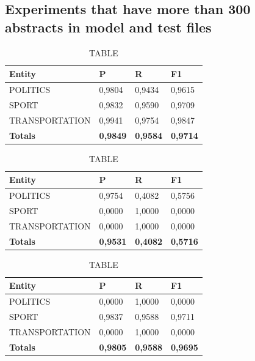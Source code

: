 \documentclass[thesis=M,english]{FITthesis}[2018/05/30]
\begin{document}

\subsection{Experiments that have more than 300 abstracts in model and test files}
	\begin{table}[H]\centering
		\caption{TABLE}
		\label{}
		\begin{tabular}{|l|l|l|l|}
			\hline {\textbf{Entity}} & {\textbf{P}} & {\textbf{R}} & {\textbf{F1}}\\\hline
				POLITICS & 0,9804 & 0,9434 & 0,9615\\
				SPORT & 0,9832 & 0,9590 & 0,9709\\
				TRANSPORTATION & 0,9941 & 0,9754 & 0,9847\\\hline
				\textbf{Totals} & \textbf{0,9849} & \textbf{0,9584} & \textbf{0,9714}\\\hline
		\end{tabular}
	\end{table}

	\begin{table}[H]\centering
		\caption{TABLE}
		\label{}
		\begin{tabular}{|l|l|l|l|}
			\hline {\textbf{Entity}} & {\textbf{P}} & {\textbf{R}} & {\textbf{F1}}\\\hline
				POLITICS & 0,9754 & 0,4082 & 0,5756\\
				SPORT & 0,0000 & 1,0000 & 0,0000\\
				TRANSPORTATION & 0,0000 & 1,0000 & 0,0000\\\hline
				\textbf{Totals} & \textbf{0,9531} & \textbf{0,4082} & \textbf{0,5716}\\\hline
		\end{tabular}
	\end{table}

	\begin{table}[H]\centering
		\caption{TABLE}
		\label{}
		\begin{tabular}{|l|l|l|l|}
			\hline {\textbf{Entity}} & {\textbf{P}} & {\textbf{R}} & {\textbf{F1}}\\\hline
				POLITICS & 0,0000 & 1,0000 & 0,0000\\
				SPORT & 0,9837 & 0,9588 & 0,9711\\
				TRANSPORTATION & 0,0000 & 1,0000 & 0,0000\\\hline
				\textbf{Totals} & \textbf{0,9805} & \textbf{0,9588} & \textbf{0,9695}\\\hline
		\end{tabular}
	\end{table}	
\end{document}
